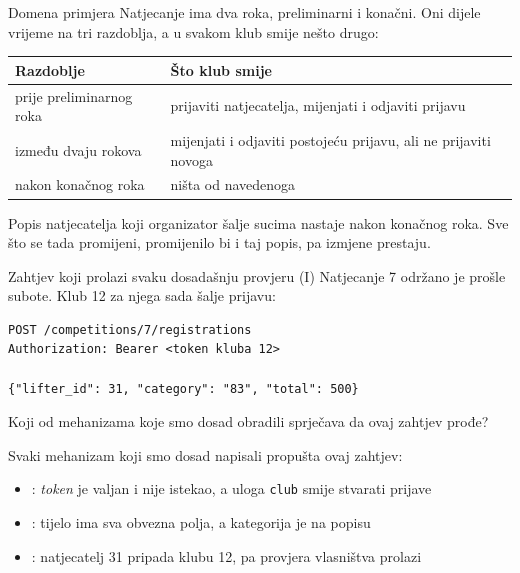 \begin{frame}{Domena primjera}
Natjecanje ima dva roka, preliminarni i konačni. Oni dijele vrijeme na tri razdoblja, a u svakom klub smije nešto drugo:

\vspace{0.5em}
\begin{center}
{\small
\setlength{\tabcolsep}{0pt}
\renewcommand{\arraystretch}{1.4}
\begin{tabular}{@{}L{4.2cm}L{7.0cm}@{}}
  \toprule
  \textbf{Razdoblje} & \textbf{Što klub smije} \\
  \midrule
  prije preliminarnog roka & prijaviti natjecatelja, mijenjati i odjaviti prijavu \\
  između dvaju rokova & mijenjati i odjaviti postojeću prijavu, ali ne prijaviti novoga \\
  nakon konačnog roka & ništa od navedenoga \\
  \bottomrule
\end{tabular}
}
\end{center}

\vspace{0.6em}
Popis natjecatelja koji organizator šalje sucima nastaje nakon konačnog roka. Sve što se tada promijeni, promijenilo bi i taj popis, pa izmjene prestaju.
\end{frame}

\begin{frame}[fragile]{Zahtjev koji prolazi svaku dosadašnju provjeru (I)}
Natjecanje 7 održano je prošle subote. Klub 12 za njega sada šalje prijavu:

\begin{lstlisting}
POST /competitions/7/registrations
Authorization: Bearer <token kluba 12>

{"lifter_id": 31, "category": "83", "total": 500}
\end{lstlisting}

\vspace{0.5em}
Koji od mehanizama koje smo dosad obradili sprječava da ovaj zahtjev prođe?

\pause
\vspace{0.5em}
Svaki mehanizam koji smo dosad napisali propušta ovaj zahtjev:

\begin{itemize}
  \itemsep0.4em
  \item {}: \emph{token} je valjan i nije istekao, a uloga \texttt{club} smije stvarati prijave
  \item {}: tijelo ima sva obvezna polja, a kategorija je na popisu
  \item {}: natjecatelj 31 pripada klubu 12, pa provjera vlasništva prolazi
\end{itemize}
\end{frame}

